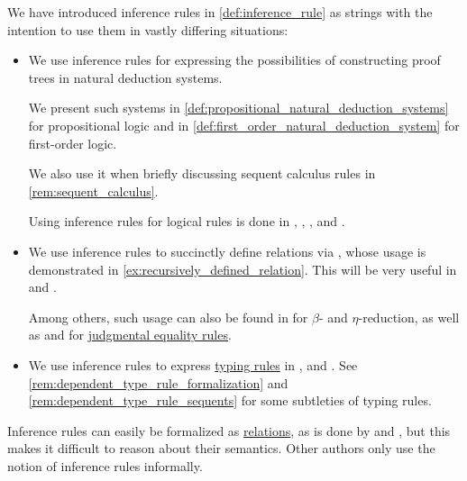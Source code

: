 \begin{remark}\label{rem:inference_rules_semantics}
  We have introduced inference rules in \cref{def:inference_rule} as strings with the intention to use them in vastly differing situations:
  \begin{itemize}
    \item We use inference rules for expressing the possibilities of constructing proof trees in natural deduction systems.

    We present such systems in \cref{def:propositional_natural_deduction_systems} for propositional logic and in \cref{def:first_order_natural_deduction_system} for first-order logic.

    We also use it when briefly discussing sequent calculus rules in \cref{rem:sequent_calculus}.

    Using inference rules for logical rules is done in
    \cite{Gentzen1935LogischeSchließen},
    \cite{TroelstraSchwichtenberg2000BasicProofTheory},
    \cite{Mimram2020ProgramEqualsProof},
    \cite{КолмогоровДрагалин2006Логика} and
    \cite{Герасимов2011Вычислимость}.

    \item We use inference rules to succinctly define relations via , whose usage is demonstrated in \cref{ex:recursively_defined_relation}. This will be very useful in  and .

    Among others, such usage can also be found in \cite{Mimram2020ProgramEqualsProof} for \( \beta \)- and \( \eta \)-reduction, as well as \cite{MartinLöf1984IntuitionisticTypeTheory} and \cite{UnivalentFoundationsProgram2013HoTT} for \hyperref[rem:type_theory_rule_classification/equality]{judgmental equality rules}.

    \item We use inference rules to express \hyperref[con:typing_rule]{typing rules} in ,  and . See \cref{rem:dependent_type_rule_formalization} and \cref{rem:dependent_type_rule_sequents} for some subtleties of typing rules.
  \end{itemize}

  Inference rules can easily be formalized as \hyperref[def:relation]{relations}, as is done by  and , but this makes it difficult to reason about their semantics. Other authors only use the notion of inference rules informally.


\end{remark}
